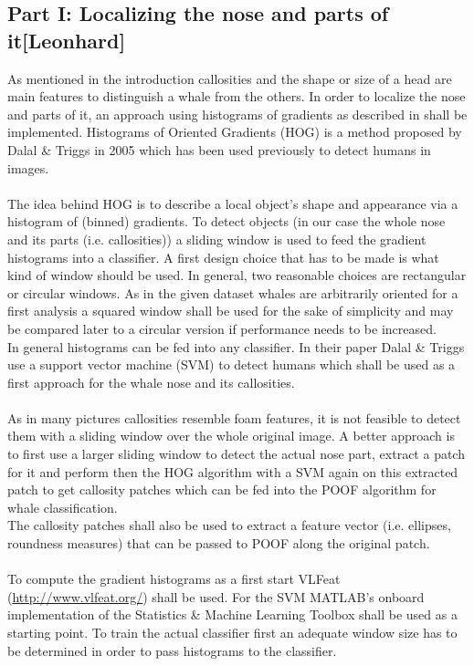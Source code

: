 \documentclass[11pt,a4paper,oneside]{report}
\begin{document}
\subsection*{Part I: Localizing the nose and parts of it[Leonhard]}
As mentioned in the introduction callosities and the shape or size of a head are main features to distinguish a whale from the others. In order to localize the nose and parts of it, an approach using histograms of gradients as described in \citep{dalal2005histograms}
shall be implemented. Histograms of Oriented Gradients (HOG) is a method proposed by Dalal \& Triggs in 2005 which has been used previously to detect humans in images. 
\\
\\
The idea behind HOG is to describe a local object's shape and appearance via a histogram of (binned) gradients. To detect objects (in our case the whole nose and its parts (i.e. callosities)) a sliding window is used to feed the gradient histograms into a classifier. A first design choice that has to be made is what kind of window should be used. In general, two reasonable choices are rectangular or circular windows. As in the given dataset whales are arbitrarily oriented for a first analysis a squared window shall be used for the sake of simplicity and may be compared later to a circular version if performance needs to be increased.
\\
In general histograms can be fed into any classifier. In their paper Dalal \& Triggs use a support vector machine (SVM) to detect humans which shall be used as a first approach for the whale nose and its callosities.
\\
\\
As in many pictures callosities resemble foam features, it is not feasible to detect them with a sliding window over the whole original image. A better approach is to first use a larger sliding window to detect the actual nose part, extract a patch for it and perform then the HOG algorithm with a SVM again on this extracted patch to get callosity patches which can be fed into the POOF algorithm for whale classification.
\\
The callosity patches shall also be used to extract a feature vector (i.e. ellipses, roundness measures) that can be passed to POOF along the original patch.
\\
\\
To compute the gradient histograms as a first start VLFeat (\url{http://www.vlfeat.org/}) shall be used. For the SVM MATLAB's onboard implementation of the Statistics \& Machine Learning Toolbox shall be used as a starting point. To train the actual classifier first an adequate window size has to be determined in order to pass histograms to the classifier.
\end{document}
